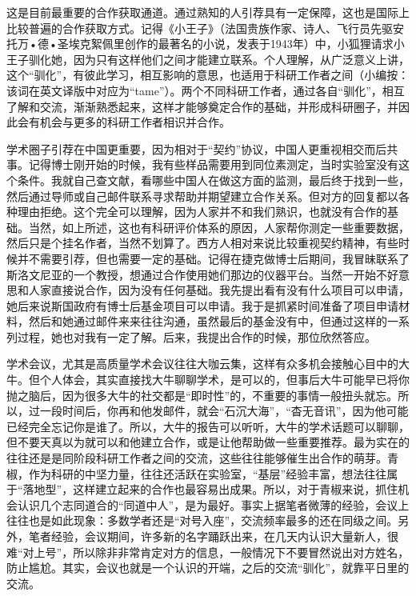 \documentclass[
]{book}
\begin{document}
这是目前最重要的合作获取通道。通过熟知的人引荐具有一定保障，这也是国际上比较普遍的合作获取方式。记得《小王子》（法国贵族作家、诗人、飞行员先驱安托万•德•圣埃克絮佩里创作的最著名的小说，发表于1943年）中，小狐狸请求小王子驯化她，因为只有这样他们之间才能建立联系。个人理解，从广泛意义上讲，这个``驯化''，有彼此学习，相互影响的意思，也适用于科研工作者之间（小编按：该词在英文译版中对应为``tame''）。两个不同科研工作者，通过各自``驯化''，相互了解和交流，渐渐熟悉起来，这样才能够奠定合作的基础，并形成科研圈子，并因此会有机会与更多的科研工作者相识并合作。

学术圈子引荐在中国更重要，因为相对于``契约''协议，中国人更重视相交而后共事。记得博士刚开始的时候，我有些样品需要用到同位素测定，当时实验室没有这个条件。我就自己查文献，看哪些中国人在做这方面的监测，最后终于找到一些，然后通过导师或自己邮件联系寻求帮助并期望建立合作关系。但对方的回复都以各种理由拒绝。这个完全可以理解，因为人家并不和我们熟识，也就没有合作的基础。当然，如上所述，这也有科研评价体系的原因，人家帮你测定一些重要数据，然后只是个挂名作者，当然不划算了。西方人相对来说比较重视契约精神，有些时候并不需要引荐，但也需要一定的基础。记得在捷克做博士后期间，我冒昧联系了斯洛文尼亚的一个教授，想通过合作使用她们那边的仪器平台。当然一开始不好意思和人家直接说合作，因为没有任何基础。我先提出看有没有什么项目可以申请，她后来说斯国政府有博士后基金项目可以申请。我于是抓紧时间准备了项目申请材料，然后和她通过邮件来来往往沟通，虽然最后的基金没有中，但通过这样的一系列过程，她也对我有一定了解。后来，我提出合作的时候，那位欣然答应。

学术会议，尤其是高质量学术会议往往大咖云集，这样有众多机会接触心目中的大牛。但个人体会，其实直接找大牛聊聊学术，是可以的，但事后大牛可能早已将你抛之脑后，因为很多大牛的社交都是``即时性''的，不重要的事情一般扭头就忘。所以，过一段时间后，你再和他发邮件，就会``石沉大海''，``杳无音讯''，因为他可能已经完全忘记你是谁了。所以，大牛的报告可以听听，大牛的学术话题可以聊聊，但不要天真以为就可以和他建立合作，或是让他帮助做一些重要推荐。最为实在的往往还是是同阶段科研工作者之间的交流，这些往往能够催生出合作的萌芽。青椒，作为科研的中坚力量，往往还活跃在实验室，``基层''经验丰富，想法往往属于``落地型''，这样建立起来的合作也最容易出成果。所以，对于青椒来说，抓住机会认识几个志同道合的``同道中人''，是为最好。事实上据笔者微薄的经验，会议上往往也是如此现象：多数学者还是``对号入座''，交流频率最多的还在同级之间。另外，笔者经验，会议期间，许多新的名字踊跃出来，在几天内认识大量新人，很难``对上号''，所以除非非常肯定对方的信息，一般情况下不要冒然说出对方姓名，防止尴尬。其实，会议也就是一个认识的开端，之后的交流``驯化''，就靠平日里的交流。
\end{document}
